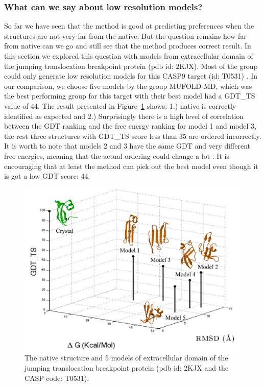 \documentclass[12pt]{article}
\begin{document}
\subsubsection{What can we say about low resolution models?}

So far we have seen that the method is good at predicting preferences when the structures are not
very far from the native. But the question remains how far from native can we go and still see 
that the method produces correct result. In this section we explored this question with models from  
extracellular domain of the jumping translocation breakpoint protein (pdb id: 2KJX). Most of the
group could only generate low resolution models for this CASP9 target (id: T0531) . In our comparison, we choose five
models by the group MUFOLD-MD, which was the best performing group for this target with their best model 
had a GDT\_TS value of 44. The result presented in Figure~\ref{fig:T0531} shows: 1.) native is correctly identified as
expected and 2.) Surprisingly there is a high level of correlation between the GDT ranking and the
free energy ranking for model 1 and model 3, the rest three structures with GDT\_TS score less than
35  are ordered incorrectly. It is worth to note that models 2 and 3 have the same GDT and very
different free energies, meaning that the actual ordering could change a lot \cite{Perez2012}. It is
encouraging that at least the method can pick out the best model even though it is got a low GDT
score: 44.  

\begin{figure}
\begin{center}
\includegraphics[width=3.5 in,height=3.5 in]{T0531.pdf}
\end{center}
\caption{The native structure and 5 models of extracellular domain of the jumping translocation
breakpoint protein (pdb id: 2KJX and the CASP code: T0531).}
\label{fig:T0531}
\end{figure}
\end{document}
